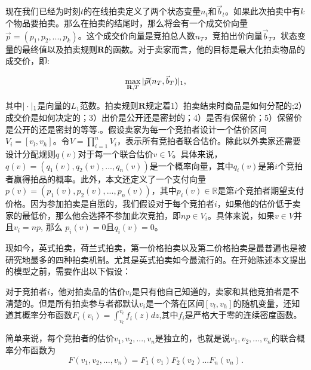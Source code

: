 现在我们已经为时刻$t$的在线拍卖定义了两个状态变量$n_t$和$\vec{b}_t$。如果此次拍卖中有$k$个物品要拍卖。那么在拍卖的结尾时，那么将会有一个成交价向量$\vec{p}=(p_1,p_2,...,p_k)$。这个成交价向量是竞拍总人数$n_T$，竞拍出价向量$\vec{b}_T$，状态变量的最终值以及拍卖规则$\textbf{R}$的函数。对于卖家而言，他的目标是最大化拍卖物品的成交价，即:

\begin{equation}
\max_{\textbf{R},T} \arrowvert \vec{p}(n_T,\vec{b}_T) \arrowvert_1,
\end{equation}

其中$\arrowvert\cdot\arrowvert_1$是向量的$L_1$范数。拍卖规则$\textbf{R}$规定着1）拍卖结束时商品是如何分配的;2）成交价是如何决定的；3）出价是公开还是密封的；4）是否有保留价；5）保留价是公开的还是密封的等等\cite{Pinker2003Managing}.。假设卖家为每一个竞拍者设计一个估价区间$V_i=[v_l,v_h]$。令$V=\prod_{i=1}^{n}V_i$，表示所有竞拍者联合估价。除此以外卖家还需要设计分配规则$q(v)$对于每一个联合估价$v \in V$。具体来说，$q(v)=(q_1(v),q_2(v),...,q_n(v))$是一个概率向量，其中$q_i(v)$是第$i$个竞拍者赢得拍品的概率。此外，本文还定义了一个支付向量$p(v)=(p_1(v),p_2(v),...,p_n(v))$，其中$p_i(v)\in \mathbb{R}$是第$i$个竞拍者期望支付价格。因为参加拍卖是自愿的，我们假设对于每个竞拍者$i$，如果他的估价低于卖家的最低价，那么他会选择不参加此次竞拍，即$np \in V_i$。具体来说，如果$v\in V$并且$v_i=np$, 那么 $p_i(v)=0$且$q_i(v)=0$。

现如今，英式拍卖，荷兰式拍卖，第一价格拍卖以及第二价格拍卖是最普遍也是被研究地最多的四种拍卖机制。尤其是英式拍卖如今最流行的。在开始陈述本文提出的模型之前，需要作出以下假设：

\begin{assmp}[个人估价私密性]
\label{conj:private value}
  对于竞拍者$i$，他对拍卖品的估价$v_i$是只有他自己知道的，卖家和其他竞拍者是不清楚的。但是所有拍卖参与者都默认$v_i$是一个落在区间$[v_l,v_h]$的随机变量，还知道其概率分布函数$F_i(v_i)=\int_{v_l}^{v_i}f_i(z)dz$,其中$f_i$是严格大于零的连续密度函数。
 
\end{assmp}

\begin{assmp}[估价的独立性]
\label{conj:independent value}
  简单来说，每个竞拍者的估价$v_1,v_2,...,v_n$是独立的，也就是说$v_1,v_2,...,v_n$的联合概率分布函数为
  \begin{equation}
	F(v_1,v_2,...,v_n)=F_1(v_1)F_2(v_2)...F_n(v_n).
	\end{equation}
 
\end{assmp}

